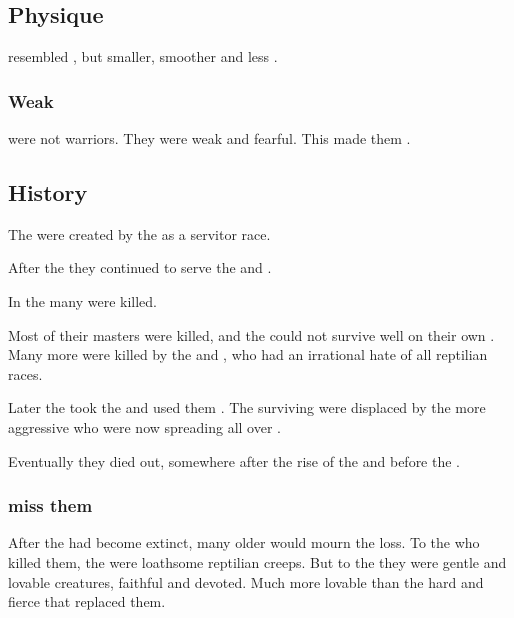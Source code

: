 \subsection{Physique}
\Loculs{} resembled \scathae{}, but smaller, smoother and less \armoured. 





\subsubsection{Weak}
\Loculs{} were not warriors.
They were weak and fearful. 
This made them . 









\subsection{History}
The \loculs{} were created by the \ophidians{} as a servitor race.

After the \firstbanewar{} they continued to serve the \dragons{} and \quiljaaran. 

In the  many \loculs{} were killed. 

Most of their \quiljaaran{} masters were killed, and the \loculs{} could not survive well on their own . 
Many more were killed by the \aryothim{} and \nephilim, who had an irrational hate of all reptilian races. 

Later the \dzraicchenosses{} took the \loculs{} and used them . 
The surviving \loculs{} were displaced by the more aggressive \scathae{} who were now spreading all over \Miith. 

Eventually they died out, somewhere after the rise of the \dzraicchenosses{} and before the \secondbanewar. 





\subsubsection{\QuilJaaran{} miss them}
After the \loculs{} had become extinct, many older \quiljaaran{} would mourn the loss. 
To the \nephilim{} who killed them, the \loculs{} were loathsome reptilian creeps.
But to the \quiljaaran{} they were gentle and lovable creatures, faithful and devoted. 
Much more lovable than the hard and fierce \scathae{} that replaced them. 

